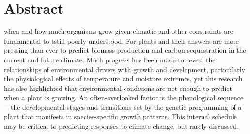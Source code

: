 \documentclass{article}
\begin{document}
\section*{Abstract} %
	when and how much organisms grow given climatic and other constraints are fundamental to  tstill poorly understood. For plants  and their answers are more pressing than ever to predict biomass production and carbon sequestration in the current and future climate. Much progress has been made to reveal the relationships of environmental drivers with growth and development, particularly the physiological effects of temperature and moisture extremes, yet this research has also highlighted that environmental conditions are not enough to predict when a plant is growing. An often-overlooked factor is the phenological sequence---the developmental stages and transitions set by the genetic programming of a plant that manifests in species-specific growth patterns. This internal schedule may be critical to predicting responses to climate change, but rarely discussed. 
\end{document}
